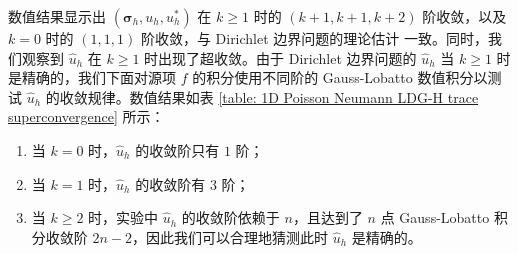 数值结果显示出 \((\bm\sigma_{h}, u_{h}, u_{h}^{\ast})\) 在 \(k \geqslant 1\) 时的 \((k+1, k+1, k+2)\) 阶收敛，以及 \(k = 0\) 时的 \((1,1,1)\) 阶收敛，与 Dirichlet 边界问题的理论估计 \cite{10.1090/S0025-5718-08-02123-6} 一致。同时，我们观察到 \(\widehat{u}_{h}\) 在 \(k \geqslant 1\) 时出现了超收敛。由于 Dirichlet 边界问题的 \(\widehat{u}_{h}\) 当 \(k \geqslant 1\) 时是精确的，我们下面对源项 \(f\) 的积分使用不同阶的 Gauss-Lobatto 数值积分以测试 \(\widehat{u}_{h}\) 的收敛规律。数值结果如表 \ref{table: 1D Poisson Neumann LDG-H trace superconvergence} 所示：
\begin{enumerate}
	\item 当 \(k = 0\) 时，\(\widehat{u}_{h}\) 的收敛阶只有 \(1\) 阶；
	\item 当 \(k = 1\) 时，\(\widehat{u}_{h}\) 的收敛阶有 \(3\) 阶；
	\item 当 \(k \geqslant 2\) 时，实验中 \(\widehat{u}_{h}\) 的收敛阶依赖于 \(n\)，且达到了 \(n\) 点 Gauss-Lobatto 积分收敛阶 \(2n-2\)，因此我们可以合理地猜测此时 \(\widehat{u}_{h}\) 是精确的。
\end{enumerate}

